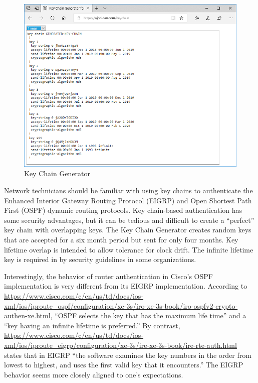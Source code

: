 \documentclass[12pt]{article}
\begin{document}
\begin{figure}[h]
\centering
\includegraphics[width=\textwidth]{Key-Chain.PNG}
\caption{Key Chain Generator}
\label{fig:keychain}
\end{figure}

Network technicians should be familiar with using key chains to authenticate the Enhanced Interior Gateway Routing Protocol (EIGRP) and Open Shortest Path First (OSPF) dynamic routing protocols. Key chain-based authentication has some security advantages, but it can be tedious and difficult to create a ``perfect'' key chain with overlapping keys. The Key Chain Generator creates random keys that are accepted for a six month period but sent for only four months. Key lifetime overlap is intended to allow tolerance for clock drift. The infinite lifetime key is required in by security guidelines in some organizations.

Interestingly, the behavior of router authentication in Cisco's OSPF implementation is very different from its EIGRP implementation. According to \url{https://www.cisco.com/c/en/us/td/docs/ios-xml/ios/iproute_ospf/configuration/xe-3s/iro-xe-3s-book/iro-ospfv2-crypto-authen-xe.html}, ``OSPF selects the key that has the maximum life time'' and a ``key having an infinite lifetime is preferred.'' By contrast, \url{https://www.cisco.com/c/en/us/td/docs/ios-xml/ios/iproute_eigrp/configuration/xe-3s/ire-xe-3s-book/ire-rte-auth.html} states that in EIGRP ``the software examines the key numbers in the order from lowest to highest, and uses the first valid key that it encounters.'' The EIGRP behavior seems more closely aligned to one's expectations.
\end{document}
